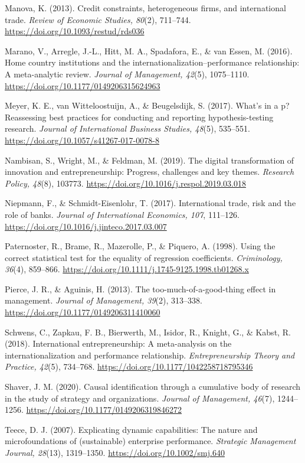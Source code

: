 \documentclass[
  12pt,a4paper]{article}
\begin{document}
Manova, K. (2013). Credit constraints, heterogeneous firms, and
international trade. \emph{Review of Economic Studies, 80}(2), 711--744.
\url{https://doi.org/10.1093/restud/rds036}

Marano, V., Arregle, J.-L., Hitt, M. A., Spadafora, E., \& van Essen, M.
(2016). Home country institutions and the
internationalization--performance relationship: A meta-analytic review.
\emph{Journal of Management, 42}(5), 1075--1110.
\url{https://doi.org/10.1177/0149206315624963}

Meyer, K. E., van Witteloostuijn, A., \& Beugelsdijk, S. (2017). What's
in a p? Reassessing best practices for conducting and reporting
hypothesis-testing research. \emph{Journal of International Business
Studies, 48}(5), 535--551.
\url{https://doi.org/10.1057/s41267-017-0078-8}

Nambisan, S., Wright, M., \& Feldman, M. (2019). The digital
transformation of innovation and entrepreneurship: Progress, challenges
and key themes. \emph{Research Policy, 48}(8), 103773.
\url{https://doi.org/10.1016/j.respol.2019.03.018}

Niepmann, F., \& Schmidt-Eisenlohr, T. (2017). International trade, risk
and the role of banks. \emph{Journal of International Economics, 107},
111--126. \url{https://doi.org/10.1016/j.jinteco.2017.03.007}

Paternoster, R., Brame, R., Mazerolle, P., \& Piquero, A. (1998). Using
the correct statistical test for the equality of regression
coefficients. \emph{Criminology, 36}(4), 859--866.
\url{https://doi.org/10.1111/j.1745-9125.1998.tb01268.x}

Pierce, J. R., \& Aguinis, H. (2013). The too-much-of-a-good-thing
effect in management. \emph{Journal of Management, 39}(2), 313--338.
\url{https://doi.org/10.1177/0149206311410060}

Schwens, C., Zapkau, F. B., Bierwerth, M., Isidor, R., Knight, G., \&
Kabst, R. (2018). International entrepreneurship: A meta-analysis on the
internationalization and performance relationship.
\emph{Entrepreneurship Theory and Practice, 42}(5), 734--768.
\url{https://doi.org/10.1177/1042258718795346}

Shaver, J. M. (2020). Causal identification through a cumulative body of
research in the study of strategy and organizations. \emph{Journal of
Management, 46}(7), 1244--1256.
\url{https://doi.org/10.1177/0149206319846272}

Teece, D. J. (2007). Explicating dynamic capabilities: The nature and
microfoundations of (sustainable) enterprise performance.
\emph{Strategic Management Journal, 28}(13), 1319--1350.
\url{https://doi.org/10.1002/smj.640}
\end{document}
